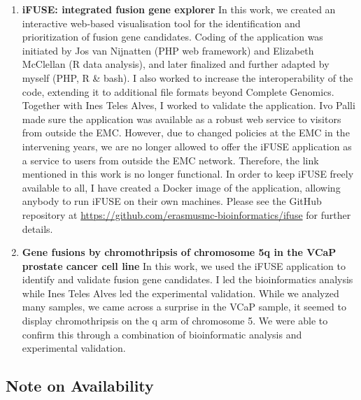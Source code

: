 \begin{enumerate}[label=\ref{chapter:fusiongenes}.\arabic*]
\itemsep-0.5em
\setcounter{enumi}{-1}
\item \textbf{iFUSE: integrated fusion gene explorer}
In this work, we created an interactive web-based visualisation tool for the identification and prioritization of fusion gene candidates. Coding of the application was initiated by Jos van Nijnatten (PHP web framework) and Elizabeth McClellan (R data analysis), and later finalized and further adapted by myself (PHP, R \& bash). I also worked to increase the interoperability of the code, extending it to additional file formats beyond Complete Genomics. Together with Ines Teles Alves, I worked to validate the application. Ivo Palli made sure the application was available as a robust web service to visitors from outside the EMC. However, due to changed policies at the EMC in the intervening years, we are no longer allowed to offer the iFUSE application as a service to users from outside the EMC network. Therefore, the link mentioned in this work is no longer functional. In order to keep iFUSE freely available to all, I have created a Docker image of the application, allowing anybody to run iFUSE on their own machines. Please see the GitHub repository at \url{https://github.com/erasmusmc-bioinformatics/ifuse} for further details.

\item \textbf{Gene fusions by chromothripsis of chromosome 5q in the VCaP prostate cancer cell line}
In this work, we used the iFUSE application to identify and validate fusion gene candidates. I led the bioinformatics analysis while Ines Teles Alves led the experimental validation. While we analyzed many samples, we came across a surprise in the VCaP sample, it seemed to display chromothripsis on the q arm of chromosome 5. We were able to confirm this through a combination of bioinformatic analysis and experimental validation.


\end{enumerate}

\subsection{Note on Availability}

